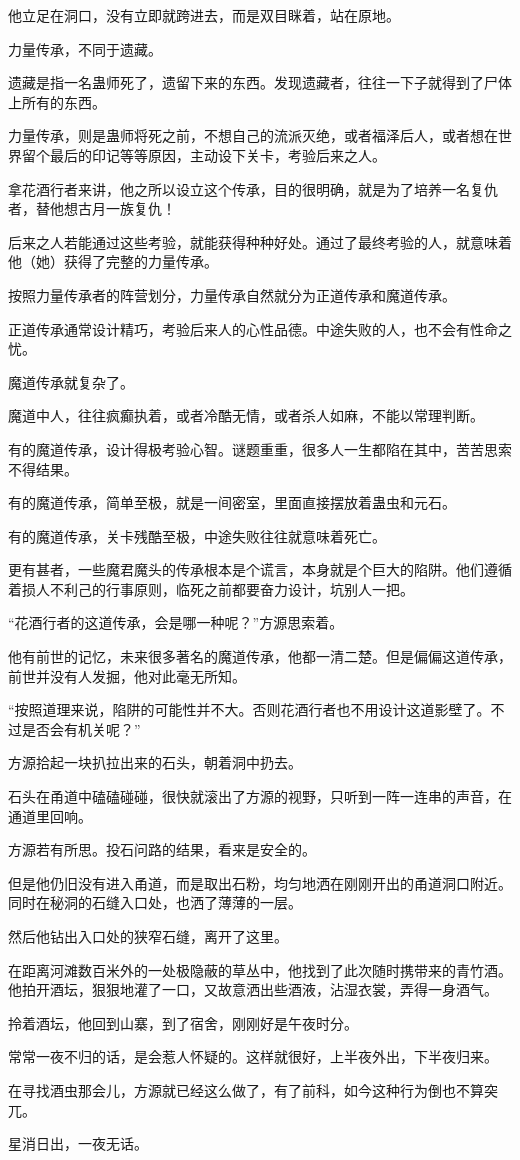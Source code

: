 \begin{this_body}
他立足在洞口，没有立即就跨进去，而是双目眯着，站在原地。

力量传承，不同于遗藏。

遗藏是指一名蛊师死了，遗留下来的东西。发现遗藏者，往往一下子就得到了尸体上所有的东西。

力量传承，则是蛊师将死之前，不想自己的流派灭绝，或者福泽后人，或者想在世界留个最后的印记等等原因，主动设下关卡，考验后来之人。

拿花酒行者来讲，他之所以设立这个传承，目的很明确，就是为了培养一名复仇者，替他想古月一族复仇！

后来之人若能通过这些考验，就能获得种种好处。通过了最终考验的人，就意味着他（她）获得了完整的力量传承。

按照力量传承者的阵营划分，力量传承自然就分为正道传承和魔道传承。

正道传承通常设计精巧，考验后来人的心性品德。中途失败的人，也不会有性命之忧。

魔道传承就复杂了。

魔道中人，往往疯癫执着，或者冷酷无情，或者杀人如麻，不能以常理判断。

有的魔道传承，设计得极考验心智。谜题重重，很多人一生都陷在其中，苦苦思索不得结果。

有的魔道传承，简单至极，就是一间密室，里面直接摆放着蛊虫和元石。

有的魔道传承，关卡残酷至极，中途失败往往就意味着死亡。

更有甚者，一些魔君魔头的传承根本是个谎言，本身就是个巨大的陷阱。他们遵循着损人不利己的行事原则，临死之前都要奋力设计，坑别人一把。

“花酒行者的这道传承，会是哪一种呢？”方源思索着。

他有前世的记忆，未来很多著名的魔道传承，他都一清二楚。但是偏偏这道传承，前世并没有人发掘，他对此毫无所知。

“按照道理来说，陷阱的可能性并不大。否则花酒行者也不用设计这道影壁了。不过是否会有机关呢？”

方源拾起一块扒拉出来的石头，朝着洞中扔去。

石头在甬道中磕磕碰碰，很快就滚出了方源的视野，只听到一阵一连串的声音，在通道里回响。

方源若有所思。投石问路的结果，看来是安全的。

但是他仍旧没有进入甬道，而是取出石粉，均匀地洒在刚刚开出的甬道洞口附近。同时在秘洞的石缝入口处，也洒了薄薄的一层。

然后他钻出入口处的狭窄石缝，离开了这里。

在距离河滩数百米外的一处极隐蔽的草丛中，他找到了此次随时携带来的青竹酒。他拍开酒坛，狠狠地灌了一口，又故意洒出些酒液，沾湿衣裳，弄得一身酒气。

拎着酒坛，他回到山寨，到了宿舍，刚刚好是午夜时分。

常常一夜不归的话，是会惹人怀疑的。这样就很好，上半夜外出，下半夜归来。

在寻找酒虫那会儿，方源就已经这么做了，有了前科，如今这种行为倒也不算突兀。

星消日出，一夜无话。

\end{this_body}

